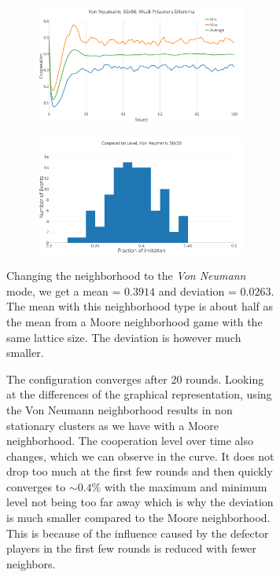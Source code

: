\documentclass[a4paper, 11pt]{article}
\begin{document}
\begin{figure}[H]
\begin{subfigure}{.55\textwidth}
	\begin{subfigure}{1\textwidth}
		\includegraphics[width=1\linewidth]{PDVonNeumann50x50}
	\end{subfigure}

	\begin{subfigure}{1\textwidth}
		\includegraphics[width=1\linewidth]{PDVonNeumann50x50HG}
	\end{subfigure}
\end{subfigure}%
\begin{subfigure}{.45\textwidth}
	Changing the neighborhood to the \textit{Von Neumann} mode, we get a mean = $0.3914$ and deviation = $0.0263$. The mean with this neighborhood type is about half as the mean from a Moore neighborhood game with the same lattice size. The deviation is however much smaller.
	
	The configuration converges after 20 rounds. Looking at the differences of the graphical representation, using the Von Neumann neighborhood results in non stationary clusters as we have with a Moore neighborhood. The cooperation level over time also changes, which we can observe in the curve. It does not drop too much at the first few rounds and then quickly converges to $\sim 0.4\%$ with the maximum and minimum level not being too far away which is why the deviation is much smaller compared to the Moore neighborhood. This is because of the influence caused by the defector players in the first few rounds is reduced with fewer neighbors.
	
	
\end{subfigure}

\end{figure}
\end{document}
